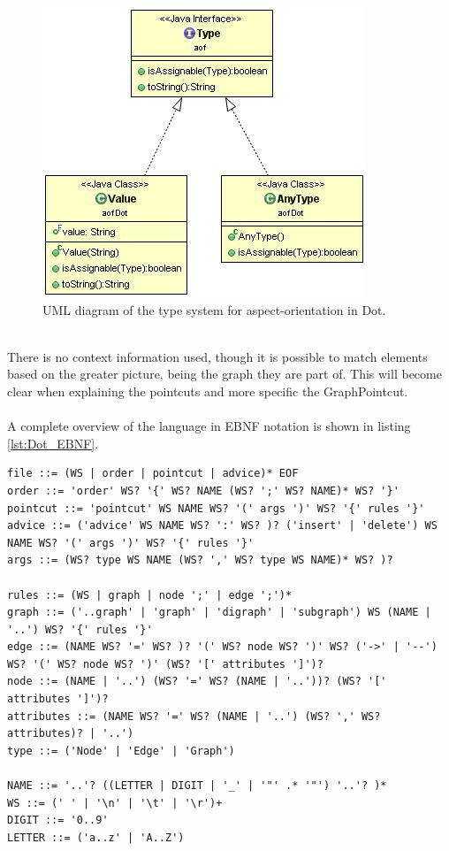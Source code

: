 \documentclass[a4paper]{report}
\begin{document}
\begin{figure}[h]
\centering
\includegraphics[scale=0.7]{images/AOFDot/DotType.jpg}
\caption{UML diagram of the type system for aspect-orientation in Dot.}
\label{fig:DotType}
\end{figure}\\
There is no context information used, though it is possible to match elements based on the greater picture, being the graph they are part of. This will become clear when explaining the pointcuts and more specific the GraphPointcut.\\
\\
A complete overview of the language in EBNF notation is shown in listing \ref{lst:Dot_EBNF}.
\begin{lstlisting}[caption=EBNF notation of the aspect language., label=lst:Dot_EBNF]
file ::= (WS | order | pointcut | advice)* EOF
order ::= 'order' WS? '{' WS? NAME (WS? ';' WS? NAME)* WS? '}'
pointcut ::= 'pointcut' WS NAME WS? '(' args ')' WS? '{' rules '}' 
advice ::= ('advice' WS NAME WS? ':' WS? )? ('insert' | 'delete') WS NAME WS? '(' args ')' WS? '{' rules '}'
args ::= (WS? type WS NAME (WS? ',' WS? type WS NAME)* WS? )?

rules ::= (WS | graph | node ';' | edge ';')*
graph ::= ('..graph' | 'graph' | 'digraph' | 'subgraph') WS (NAME | '..') WS? '{' rules '}'
edge ::= (NAME WS? '=' WS? )? '(' WS? node WS? ')' WS? ('->' | '--') WS? '(' WS? node WS? ')' (WS? '[' attributes ']')?
node ::= (NAME | '..') (WS? '=' WS? (NAME | '..'))? (WS? '[' attributes ']')?
attributes ::= (NAME WS? '=' WS? (NAME | '..') (WS? ',' WS? attributes)? | '..')
type ::= ('Node' | 'Edge' | 'Graph')

NAME ::= '..'? ((LETTER | DIGIT | '_' | '"' .* '"') '..'? )* 
WS ::= (' ' | '\n' | '\t' | '\r')+
DIGIT ::= '0..9'
LETTER ::= ('a..z' | 'A..Z')
\end{lstlisting}
\end{document}
